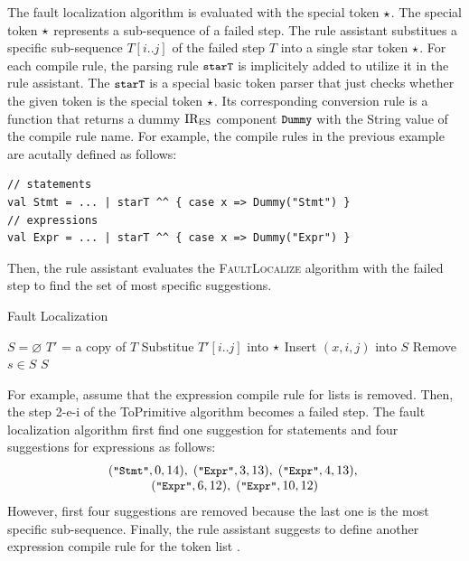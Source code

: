 The fault localization algorithm is evaluated with the special token \( \star \).
The special token \( \star \) represents a sub-sequence of a failed step.
The rule assistant substitues a specific sub-sequence \( T[i..j] \) of the
failed step \( T \) into a single star token \( \star \). For each compile rule,
the parsing rule  \( \texttt{\small starT} \) is implicitely added to utilize it in the
rule assistant. The \( \texttt{\small starT} \) is a special basic token parser
that just checks whether the given token is the special token \( \star \).
Its corresponding conversion rule is a function that returns a dummy
\( \text{IR}_\text{ES} \) component \( \texttt{\small Dummy} \) with the String value of the
compile rule name. For example, the compile rules in the previous example are
acutally defined as follows:
\begin{lstlisting}[style=myScalastyle]
// statements
val Stmt = ... | starT ^^ { case x => Dummy("Stmt") }
// expressions
val Expr = ... | starT ^^ { case x => Dummy("Expr") }
\end{lstlisting}
Then, the rule assistant evaluates the \textsc{FaultLocalize} algorithm
with the failed step to find the set of most specific suggestions.
\begin{algorithm}
  \caption{Fault Localization}
  \begin{algorithmic}[1]
    \State $S = \varnothing$
    \State $T'$ = a copy of $T$
    \State Substitue $T'[i..j]$ into $\star$
    \State Insert $(x, i, j)$ into $S$
    \EndIf
    \EndFor
    \EndFor
    \State Remove $s \in S$
    \EndIf
    \EndWhile
    \State \Return $S$
    \EndFunction
  \end{algorithmic}
\end{algorithm}

For example, assume that the expression compile rule for lists is removed.
Then, the step 2-e-i of the ToPrimitive algorithm becomes a failed step.
The fault localization algorithm first find one suggestion for statements
and four suggestions for expressions as follows:
\[
  \begin{array}{c}
    (\texttt{\small"Stmt"}, 0, 14), \;
    (\texttt{\small"Expr"}, 3, 13), \;
    (\texttt{\small"Expr"}, 4, 13), \;\\
    (\texttt{\small"Expr"}, 6, 12), \;
    (\texttt{\small"Expr"}, 10, 12)
  \end{array}
\]
However, first four suggestions are removed because the last one is the most
specific sub-sequence. Finally, the rule assistant suggests to define
another expression compile rule for the token list \hint{}.
